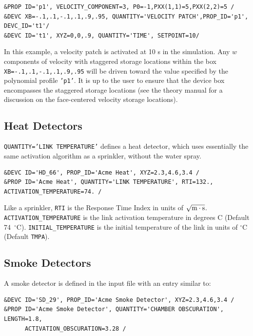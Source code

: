 \documentclass[11pt]{book}
\newcommand{\ct}{\tt\small}
\begin{document}
\footnotesize
\begin{verbatim}
&PROP ID='p1', VELOCITY_COMPONENT=3, P0=-1,PXX(1,1)=5,PXX(2,2)=5 /
&DEVC XB=-.1,.1,-.1,.1,.9,.95, QUANTITY='VELOCITY PATCH',PROP_ID='p1', DEVC_ID='t1'/
&DEVC ID='t1', XYZ=0,0,.9, QUANTITY='TIME', SETPOINT=10/
\end{verbatim}

\normalsize
\noindent
In this example, a velocity patch is activated at 10 s in the simulation.  Any $w$ components of velocity with staggered storage locations within the box {\ct XB=-.1,.1,-.1,.1,.9,.95} will be driven toward the value specified by the polynomial profile {\ct 'p1'}.  It is up to the user to ensure that the device box encompasses the staggered storage locations (see the theory manual \cite{FDS_Math_Guide} for a discussion on the face-centered velocity storage locations).

\subsection{Heat Detectors}
\label{info:heat_detectors}

{\ct QUANTITY='LINK TEMPERATURE'} defines a heat detector, which uses essentially the same activation algorithm as a sprinkler, without the water spray.

\footnotesize
\begin{verbatim}
&DEVC ID='HD_66', PROP_ID='Acme Heat', XYZ=2.3,4.6,3.4 /
&PROP ID='Acme Heat', QUANTITY='LINK TEMPERATURE', RTI=132., ACTIVATION_TEMPERATURE=74. /
\end{verbatim}

\normalsize
\noindent
Like a sprinkler, {\ct RTI} is the Response Time Index in units of
$\sqrt{\hbox{m}\cdot \hbox{s}}$.
{\ct ACTIVATION\_TEMPERATURE} is the link activation temperature in degrees C (Default 74~$^\circ$C).
{\ct INITIAL\_TEMPERATURE} is the initial temperature of the link in units of $^\circ$C (Default {\ct TMPA}).



\subsection{Smoke Detectors}
\label{info:smoke_detector}

A smoke detector is defined in the input file with an entry similar to:

\footnotesize
\begin{verbatim}
&DEVC ID='SD_29', PROP_ID='Acme Smoke Detector', XYZ=2.3,4.6,3.4 /
&PROP ID='Acme Smoke Detector', QUANTITY='CHAMBER OBSCURATION', LENGTH=1.8,
      ACTIVATION_OBSCURATION=3.28 /
\end{verbatim}
\end{document}
